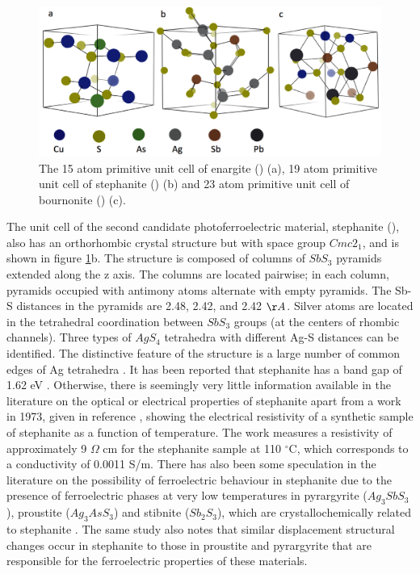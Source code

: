 \begin{figure}[h!]
  \centering
    \includegraphics[width=1.0\textwidth]{figures/unit_cells.png}
    \caption{The 15 atom primitive unit cell of enargite (\enargite) (a), 19 atom primitive unit cell of stephanite (\stephanite) (b) and 23 atom primitive unit cell of bournonite (\bournonite) (c).}
  \label{unit_cells}
\end{figure}

The unit cell of the second candidate photoferroelectric material, stephanite (\stephanite), also has an orthorhombic crystal structure but with space group $Cmc2_1$, and is shown in figure \ref{unit_cells}b. 
The structure is composed of columns of $SbS_3$ pyramids extended along the z axis. The columns are located pairwise; in each column, pyramids occupied with antimony atoms alternate with empty pyramids. The Sb-S distances in the pyramids are 2.48, 2.42, and 2.42 $\AA$. Silver atoms are located in the tetrahedral coordination between $SbS_3$ groups (at the centers of rhombic channels). Three types of $AgS_4$ tetrahedra with different Ag-S distances can be identified. The distinctive feature of the structure is a large number of common edges of Ag tetrahedra \cite{stephanite}.
It has been reported that stephanite has a band gap of 1.62 eV \cite{Dittrich1}. Otherwise, there is seemingly very little information available in the literature on the optical or electrical properties of stephanite apart from a work in 1973, given in reference , showing the electrical resistivity of a synthetic sample of stephanite as a function of temperature. The work measures a resistivity of approximately 9 $\Omega$ cm for the stephanite sample at 110 $^\circ$C, which corresponds to a conductivity of 0.0011 S/m. There has also been some speculation in the literature on the possibility of ferroelectric behaviour in stephanite due to the presence of ferroelectric phases at very low temperatures in pyrargyrite ($Ag_3SbS_3$), proustite ($Ag_3AsS_3$) and stibnite ($Sb_2S_3$), which are crystallochemically related to stephanite \cite{stephanite}. The same study also notes that similar displacement structural changes occur in stephanite to those in proustite and pyrargyrite that are responsible for the ferroelectric properties of these materials.\\

